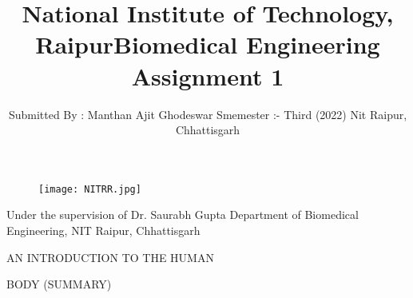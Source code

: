 \documentclass[12pt]{article}
\title{National Institute of Technology, Raipur}
\begin{document}
\maketitle
\begin{figure}[h]
\centering
\texttt{[image: NITRR.jpg]}
\end{figure}
\bigskip
\bigskip
\centering
\begin{Large}
\title{Biomedical Engineering Assignment 1}
\end{Large}

\bigskip
\bigskip
\bigskip
\bigskip

\raggedright
\begin{multicols}{2}
\author{Submitted By : Manthan Ajit Ghodeswar
\linebreak Smemester :- Third (2022)
\linebreak Nit Raipur, Chhattisgarh}
\columnbreak
\columnbreak


Under the supervision of 
\linebreak Dr. Saurabh Gupta
\linebreak Department of Biomedical Engineering,
\linebreak NIT Raipur, Chhattisgarh
\end{multicols}

\clearpage

\centering
\tableofcontents
\clearpage

\begin{LARGE}
\centering
AN INTRODUCTION TO THE HUMAN 
\linebreak 

BODY (SUMMARY)
\end{LARGE}
\end{document}
